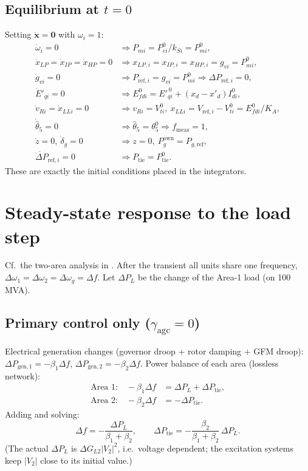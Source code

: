 \documentclass[11pt,a4paper]{article}
\numberwithin{equation}{section}
\begin{document}
\subsection{Equilibrium at $t=0$}
Setting $\dot{\bm x}=\bm 0$ with $\omega_i=1$:
\begin{align}
\dot\omega_i = 0 &\Rightarrow P_{mi} = P_{ei}^0/k_{Si} = P_{mi}^0,\\
\dot x_{LP}=\dot x_{IP}=\dot x_{HP}=0 &\Rightarrow x_{LP,i}=x_{IP,i}=x_{HP,i}=g_{vi}=P_{mi}^0,\\
\dot g_{vi}=0 &\Rightarrow P_{\text{ref},i} = g_{vi} = P_{mi}^0\Rightarrow \Delta P_{\text{ref},i}=0,\\
\dot E'_{qi}=0 &\Rightarrow E_{fdi}^0 = E'^{\,0}_{qi} + (x_d-x'_d)I_{di}^0,\\
\dot v_{Ri}=\dot x_{LLi}=0 &\Rightarrow v_{Ri}=V_{ti}^0,\ x_{LLi}=V_{\text{ref},i}-V_{ti}^0 = E_{fdi}^0/K_A,\\
\dot{\hat\theta}_5=0 &\Rightarrow \hat\theta_5=\theta_5^0\Rightarrow f_{\text{meas}}=1,\\
\dot z = 0,\ \dot\delta_g=0 &\Rightarrow z=0,\ P_g^{\text{own}} = P_{g,\text{ref}},\\
\dot{\Delta P}_{\text{ref},i}=0 &\Rightarrow P_{\text{tie}} = P_{\text{tie}}^0 .
\end{align}
These are exactly the initial conditions placed in the integrators.

\section{Steady-state response to the load step}\label{sec:ss}
%
\noindent Cf.\ the two-area analysis in \cite[Ch.~11]{Kundur1994}.
After the transient all units share one frequency, $\Delta\omega_1=\Delta\omega_2=\Delta\omega_g=\Delta f$. Let $\Delta P_L$ be the change of the Area-1 load (on 100 MVA).

\subsection{Primary control only ($\gamma_{\text{agc}}=0$)}
Electrical generation changes (governor droop + rotor damping + GFM droop): $\Delta P_{\text{gen},1} = -\beta_1\Delta f$, $\Delta P_{\text{gen},2} = -\beta_2\Delta f$.
Power balance of each area (lossless network):
\begin{align}
\text{Area 1:}\quad -\beta_1\Delta f &= \Delta P_L + \Delta P_{\text{tie}},\\
\text{Area 2:}\quad -\beta_2\Delta f &= -\Delta P_{\text{tie}} .
\end{align}
Adding and solving:
\begin{equation}
\boxed{\Delta f = -\frac{\Delta P_L}{\beta_1+\beta_2},\qquad
\Delta P_{\text{tie}} = -\frac{\beta_2}{\beta_1+\beta_2}\,\Delta P_L .}
\end{equation}
(The actual $\Delta P_L$ is $\Delta G_{L2}|V_2|^2$, i.e.\ voltage dependent; the excitation systems keep $|V_2|$ close to its initial value.)
\end{document}
